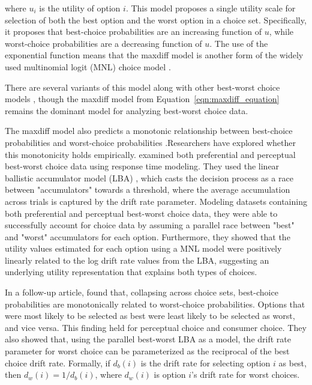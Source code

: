 where $u_{i}$ is the utility of option $i$. This model proposes a single utility scale  for selection of both the best option and the worst option in a choice set. Specifically, it proposes that best-choice probabilities are an increasing function of $u$, while worst-choice probabilities are a decreasing function of $u$. The use of the exponential function means that the maxdiff model is another form of the widely used multinomial logit (MNL) choice model \parencite{hausman1984specification}. 

There are several variants of this model along with other best-worst choice models \parencite{marleyProbabilisticModelsBest2005,marleyProbabilisticModelsSetdependent2008,marleyModelsBestWorst2012,flynnBestWorstScaling2007,flynn2014best}, though the maxdiff model from Equation~\ref{eqn:maxdiff_equation} remains the dominant model for analyzing best-worst choice data.

The maxdiff model also predicts a monotonic relationship between best-choice probabilities and worst-choice probabilities \parencite{hawkinsBestTimesWorst2014}.Researchers have explored whether this monotonicity holds empirically. \textcite{hawkinsIntegratingCognitiveProcess2014a} examined both preferential and perceptual best-worst choice data using response time modeling. They used the linear ballistic accumulator model (LBA) \parencite{brownSimplestCompleteModel2008b}, which casts the decision process as a race between "accumulators" towards a threshold, where the average accumulation across trials is captured by the drift rate parameter. Modeling datasets containing both preferential and perceptual best-worst choice data, they were able to successfully account for choice data by assuming a parallel race between "best" and "worst" accumulators for each option. Furthermore, they showed that the utility values estimated for each option using a MNL model were positively linearly related to the log drift rate values from the LBA, suggesting an underlying utility representation that explains both types of choices. 

In a follow-up article, \textcite{hawkinsBestTimesWorst2014} found that, collapsing across choice sets, best-choice probabilities are monotonically related to worst-choice probabilities. Options that were most likely to be selected as best were least likely to be selected as worst, and vice versa. This finding held for perceptual choice and consumer choice. They also showed that, using the parallel best-worst LBA as a model, the drift rate parameter for worst choice can be parameterized as the reciprocal of the best choice drift rate. Formally, if $d_{b}(i)$ is the drift rate for selecting option $i$ as best, then $d_{w}(i)=1/d_{b}(i)$, where $d_{w}(i)$ is option $i$'s drift rate for worst choices. 

